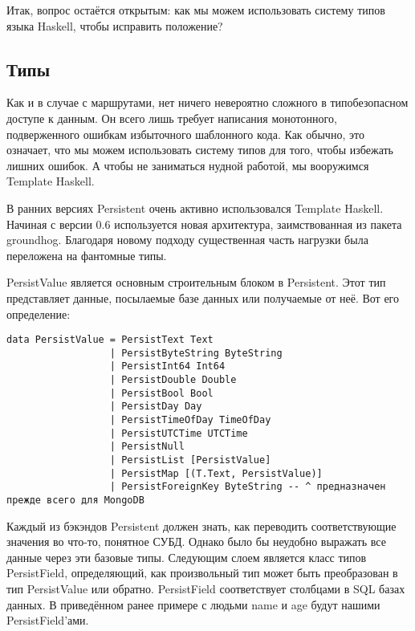 Итак, вопрос остаётся открытым: как мы можем использовать систему типов языка Haskell, чтобы исправить положение?

\subsection{Типы} %

Как и в случае с маршрутами, нет ничего невероятно сложного в типобезопасном доступе к данным. Он всего лишь требует написания монотонного, подверженного ошибкам избыточного шаблонного кода. Как обычно, это означает, что мы можем использовать систему типов для того, чтобы избежать лишних ошибок. А чтобы не заниматься нудной работой, мы вооружимся Template Haskell.

\begin{remark}
В ранних версиях Persistent очень активно использовался Template Haskell. Начиная с версии 0.6 используется новая архитектура, заимствованная из пакета groundhog. Благодаря новому подходу существенная часть нагрузки была переложена на фантомные типы.
\end{remark}

PersistValue является основным строительным блоком в Persistent. Этот тип представляет данные, посылаемые базе данных или получаемые от неё. Вот его определение:

\begin{lstlisting}
data PersistValue = PersistText Text
                  | PersistByteString ByteString
                  | PersistInt64 Int64
                  | PersistDouble Double
                  | PersistBool Bool
                  | PersistDay Day
                  | PersistTimeOfDay TimeOfDay
                  | PersistUTCTime UTCTime
                  | PersistNull
                  | PersistList [PersistValue]
                  | PersistMap [(T.Text, PersistValue)]
                  | PersistForeignKey ByteString -- ^ предназначен прежде всего для MongoDB
\end{lstlisting}

Каждый из бэкэндов Persistent должен знать, как переводить соответствующие значения во что-то, понятное СУБД. Однако было бы неудобно выражать все данные через эти базовые типы. Следующим слоем является класс типов PersistField, определяющий, как произвольный тип может быть преобразован в тип PersistValue или обратно. PersistField соответствует столбцами в SQL базах данных. В приведённом ранее примере с людьми name и age будут нашими PersistField'ами.

